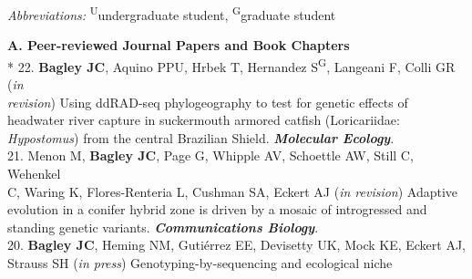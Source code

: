 \documentclass[margin,line]{res}
\begin{document}
\begin{resume}

\emph{Abbreviations:} \textsuperscript{U}undergraduate student, \textsuperscript{G}graduate student

\textbf{A. Peer-reviewed Journal Papers and Book Chapters}\vspace{2mm}\\*
22. \textbf{Bagley JC}, Aquino PPU, Hrbek T, Hernandez S\textsuperscript{G}, Langeani F, Colli GR (\emph{in}\\
\hspace*{8mm} \emph{revision}) Using ddRAD-seq phylogeography to test for genetic effects of \\
\hspace*{8mm} headwater river capture in suckermouth armored catfish (Loricariidae:\\ \vspace{2mm}
\hspace*{8mm}\emph{Hypostomus}) from the central Brazilian Shield. {\it \textbf{Molecular Ecology}}.\\%
21. Menon M, \textbf{Bagley JC}, Page G, Whipple AV, Schoettle AW, Still C, Wehenkel\\
\hspace*{8mm} C, Waring K, Flores-Renteria L, Cushman SA, Eckert AJ (\emph{in revision}) Adaptive\\
\hspace*{8mm} evolution in a conifer hybrid zone is driven by a mosaic of introgressed and\\ \vspace{2mm}
\hspace*{8mm}standing genetic variants. {\it \textbf{Communications Biology}}. \\
20. \textbf{Bagley JC}, Heming NM, Guti\'{e}rrez EE, Devisetty UK, Mock KE, Eckert AJ,\\
\hspace*{8mm} Strauss SH (\emph{in press}) Genotyping-by-sequencing and ecological niche \\

\end{resume}
\end{document}
